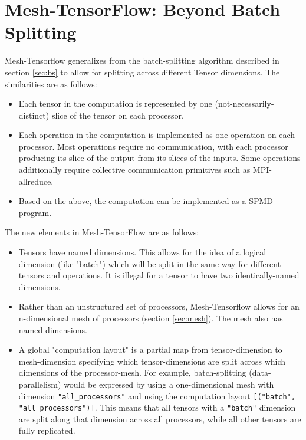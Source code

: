 \documentclass{article}
\begin{document}
\section{Mesh-TensorFlow: Beyond Batch Splitting}
Mesh-Tensorflow generalizes from the batch-splitting algorithm described in section \ref{sec:bs} to allow for splitting across different Tensor dimensions.  The similarities are as follows:

\begin{itemize}

\item Each tensor in the computation is represented by one (not-necessarily-distinct) slice of the tensor on each processor.

\item Each operation in the computation is implemented as one operation on each processor.  Most operations require no communication, with each processor producing its slice of the output from its slices of the inputs.  Some operations additionally require collective communication primitives such as MPI-allreduce.

\item Based on the above, the computation can be implemented as a SPMD program.

\end{itemize}

The new elements in Mesh-TensorFlow are as follows:

\begin{itemize}

\item Tensors have named dimensions.  This allows for the idea of a logical dimension (like "batch") which will be split in the same way for different tensors and operations.  It is illegal for a tensor to have two identically-named dimensions. 

\item Rather than an unstructured set of processors, Mesh-Tensorflow allows for an n-dimensional mesh of processors (section \ref{sec:mesh}).  The mesh also has named dimensions.

\item A global "computation layout" is a partial map from tensor-dimension to mesh-dimension specifying which tensor-dimensions are split across which dimensions of the processor-mesh.  For example, batch-splitting (data-parallelism) would be expressed by using a one-dimensional mesh with dimension \texttt{"all\_processors"} and using the computation layout \texttt{[("batch", "all\_processors")]}.  This means that all tensors with a \texttt{"batch"} dimension are split along that dimension across all processors, while all other tensors are fully replicated.  

\end{itemize}
\end{document}
